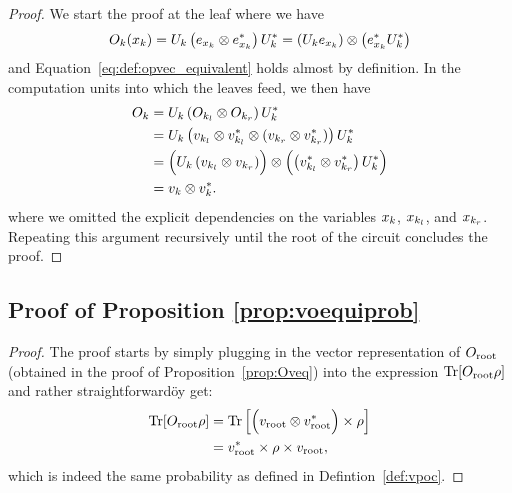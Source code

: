 \begin{proof}
	We start the proof at the leaf where we have
	\begin{align}
		O_k(x_k)
		=
		U_k \left( e_{x_k} \otimes e_{x_k}^*  \right) U_k^*
		=
		\left( U_k e_{x_k} \right) \otimes \left( e_{x_k}^* U_k^* \right)
	\end{align}
	and Equation~\ref{eq:def:opvec_equivalent} holds almost by definition. In the computation units into which the leaves feed, we then have
	\begin{align}
		O_k
		 & = U_k \left( O_{k_l} \otimes O_{k_r} \right) U_k^*
		\nonumber
		\\
		 & = U_k \left( v_{k_l} \otimes v^*_{k_l} \otimes (v_{k_r} \otimes v^*_{k_r} ) \right) U_k^*
		\nonumber
		\\
		 & = \Bigl( U_k \left( v_{k_l} \otimes v_{k_r} \right) \Bigr)
		\otimes
		\Bigl( \left( v^*_{k_l}  \otimes v^*_{k_r}  \right) U_k^* \Bigr)
		\nonumber
		\\
		 & = v_k \otimes v_k^*.
	\end{align}
	where we omitted the explicit dependencies on the variables $x_k$, $x_{k_l}$, and $x_{k_r}$.
	Repeating this argument recursively until the root of the circuit concludes the proof.
\end{proof}




\subsection{Proof of Proposition \ref{prop:voequiprob}}
\label{sec:proof:prop:voequiprob}

\propvoequiprob*





\begin{proof}
	The proof starts by simply plugging in the vector representation of $O_{\text{root}}$ (obtained in the proof of Proposition~\ref{prop:Oveq}) into the expression $\Tr [O_{\text{root}} \rho]$ and rather straightforwardöy get:
	\begin{align}
		\Tr [O_{\text{root}} \rho]
		 &
		=
		\Tr \left[
			\Bigl(v_{\text{root}} \otimes v^*_{\text{root}}   \Bigr) \times \rho
			\right]
		\\
		 & = v^*_{\text{root}} \times  \rho \times v_{\text{root}},
	\end{align}
	which is indeed the same probability as defined in Defintion~\ref{def:vpoc}.
\end{proof}





